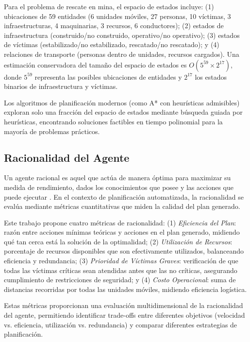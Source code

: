 \documentclass[conference]{IEEEtran}
\begin{document}
    Para el problema de rescate en mina, el espacio de estados incluye: (1) ubicaciones de 59 entidades (6 unidades móviles, 27 personas, 10 víctimas, 3 infraestructuras, 4 maquinarias, 3 recursos, 6 conductores); (2) estados de infraestructura (construido/no construido, operativo/no operativo); (3) estados de víctimas (estabilizado/no estabilizado, rescatado/no rescatado); y (4) relaciones de transporte (personas dentro de unidades, recursos cargados). Una estimación conservadora del tamaño del espacio de estados es $O(5^{59} \times 2^{17})$, donde $5^{59}$ representa las posibles ubicaciones de entidades y $2^{17}$ los estados binarios de infraestructura y víctimas.

    Los algoritmos de planificación modernos (como A* con heurísticas admisibles) exploran solo una fracción del espacio de estados mediante búsqueda guiada por heurísticas, encontrando soluciones factibles en tiempo polinomial para la mayoría de problemas prácticos.

    \subsection{Racionalidad del Agente}

    Un agente racional es aquel que actúa de manera óptima para maximizar su medida de rendimiento, dados los conocimientos que posee y las acciones que puede ejecutar \cite{russell2020aima}. En el contexto de planificación automatizada, la racionalidad se evalúa mediante métricas cuantitativas que miden la calidad del plan generado.

    Este trabajo propone cuatro métricas de racionalidad: (1) \textit{Eficiencia del Plan}: razón entre acciones mínimas teóricas y acciones en el plan generado, midiendo qué tan cerca está la solución de la optimalidad; (2) \textit{Utilización de Recursos}: porcentaje de recursos disponibles que son efectivamente utilizados, balanceando eficiencia y redundancia; (3) \textit{Prioridad de Víctimas Graves}: verificación de que todas las víctimas críticas sean atendidas antes que las no críticas, asegurando cumplimiento de restricciones de seguridad; y (4) \textit{Costo Operacional}: suma de distancias recorridas por todas las unidades móviles, midiendo eficiencia logística.

    Estas métricas proporcionan una evaluación multidimensional de la racionalidad del agente, permitiendo identificar trade-offs entre diferentes objetivos (velocidad vs. eficiencia, utilización vs. redundancia) y comparar diferentes estrategias de planificación.
\end{document}
